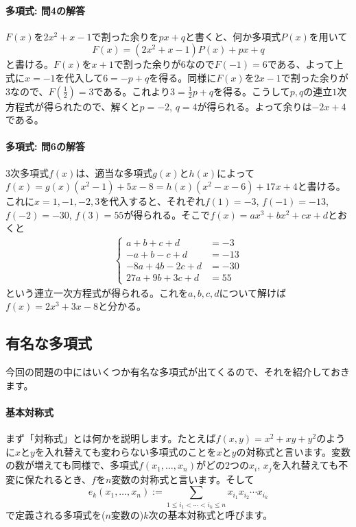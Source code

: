 \paragraph{多項式: 問4の解答} 	$F(x)$を$2x^2+x-1$で割った余りを$px+q$と書くと、何か多項式$P(x)$を用いて
\[
F(x) = (2x^2+x-1)P(x) + px + q
\]
と書ける。$F(x)$を$x+1$で割った余りが$6$なので$F(-1)=6$である、よって上式に$x=-1$を代入して$6=-p+q$を得る。同様に$F(x)$を$2x-1$で割った余りが$3$なので、$F(\frac{1}{2})=3$である。これより$3=\frac{1}{2}p+q$を得る。こうして$p,q$の連立$1$次方程式が得られたので、解くと$p=-2$, $q=4$が得られる。よって余りは$-2x+4$である。

\paragraph{多項式: 問6の解答}
$3$次多項式$f(x)$は、適当な多項式$g(x)$と$h(x)$によって$f(x)=g(x)(x^2-1)+5x-8=h(x)(x^2-x-6)+17x+4$と書ける。これに$x=1,-1,-2,3$を代入すると、それぞれ$f(1)=-3$, $f(-1)=-13$, $f(-2)=-30$, $f(3)=55$が得られる。そこで$f(x)=ax^3+bx^2+cx+d$とおくと
\begin{align*}
\begin{cases}
a+b+c+d &= -3 \\
-a+b-c+d &= -13 \\
-8a+4b-2c+d &= -30 \\
27a + 9b + 3c + d &= 55
\end{cases}
\end{align*}
という連立一次方程式が得られる。これを$a,b,c,d$について解けば$f(x) = 2x^3+3x-8$と分かる。

\subsection{有名な多項式}

今回の問題の中にはいくつか有名な多項式が出てくるので、それを紹介しておきます。

\paragraph{基本対称式}

まず「対称式」とは何かを説明します。たとえば$f(x,y)=x^2+xy+y^2$のように$x$と$y$を入れ替えても変わらない多項式のことを$x$と$y$の対称式と言います。変数の数が増えても同様で、多項式$f(x_1,\ldots,x_n)$がどの$2$つの$x_i$, $x_j$を入れ替えても不変に保たれるとき、$f$を$n$変数の対称式と言います。そして
\[
e_k(x_1,\ldots,x_n) := \sum_{1\leq i_1 < \cdots < i_k \leq n} x_{i_1} x_{i_2} \cdots x_{i_k}
\]
で定義される多項式を($n$変数の)$k$次の基本対称式と呼びます。

